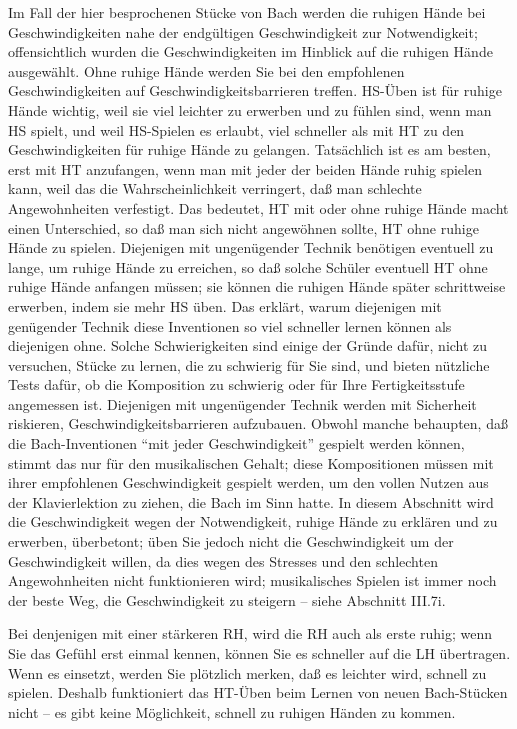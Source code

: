 Im Fall der hier besprochenen Stücke von Bach werden die ruhigen Hände bei Geschwindigkeiten nahe der endgültigen Geschwindigkeit zur Notwendigkeit; offensichtlich wurden die Geschwindigkeiten im Hinblick auf die ruhigen Hände ausgewählt.
Ohne ruhige Hände werden Sie bei den empfohlenen Geschwindigkeiten auf Geschwindigkeitsbarrieren treffen.
HS-Üben ist für ruhige Hände wichtig, weil sie viel leichter zu erwerben und zu fühlen sind, wenn man HS spielt, und weil HS-Spielen es erlaubt, viel schneller als mit HT zu den Geschwindigkeiten für ruhige Hände zu gelangen.
Tatsächlich ist es am besten, erst mit HT anzufangen, wenn man mit jeder der beiden Hände ruhig spielen kann, weil das die Wahrscheinlichkeit verringert, daß man schlechte Angewohnheiten verfestigt.
Das bedeutet, HT mit oder ohne ruhige Hände macht einen Unterschied, so daß man sich nicht angewöhnen sollte, HT ohne ruhige Hände zu spielen.
Diejenigen mit ungenügender Technik benötigen eventuell zu lange, um ruhige Hände zu erreichen, so daß solche Schüler eventuell HT ohne ruhige Hände anfangen müssen; sie können die ruhigen Hände später schrittweise erwerben, indem sie mehr HS üben.
Das erklärt, warum diejenigen mit genügender Technik diese Inventionen so viel schneller lernen können als diejenigen ohne.
Solche Schwierigkeiten sind einige der Gründe dafür, nicht zu versuchen, Stücke zu lernen, die zu schwierig für Sie sind, und bieten nützliche Tests dafür, ob die Komposition zu schwierig oder für Ihre Fertigkeitsstufe angemessen ist.
Diejenigen mit ungenügender Technik werden mit Sicherheit riskieren, Geschwindigkeitsbarrieren aufzubauen.
Obwohl manche behaupten, daß die Bach-Inventionen \enquote{mit jeder Geschwindigkeit} gespielt werden können, stimmt das nur für den musikalischen Gehalt; diese Kompositionen müssen mit ihrer empfohlenen Geschwindigkeit gespielt werden, um den vollen Nutzen aus der Klavierlektion zu ziehen, die Bach im Sinn hatte.
In diesem Abschnitt wird die Geschwindigkeit wegen der Notwendigkeit, ruhige Hände zu erklären und zu erwerben, überbetont;
üben Sie jedoch nicht die Geschwindigkeit um der Geschwindigkeit willen, da dies wegen des Stresses und den schlechten Angewohnheiten nicht funktionieren wird; musikalisches Spielen ist immer noch der beste Weg, die Geschwindigkeit zu steigern -- siehe Abschnitt III.7i.

Bei denjenigen mit einer stärkeren RH, wird die RH auch als erste ruhig; wenn Sie das Gefühl erst einmal kennen, können Sie es schneller auf die LH übertragen.
Wenn es einsetzt, werden Sie plötzlich merken, daß es leichter wird, schnell zu spielen.
Deshalb funktioniert das HT-Üben beim Lernen von neuen Bach-Stücken nicht -- es gibt keine Möglichkeit, schnell zu ruhigen Händen zu kommen.

